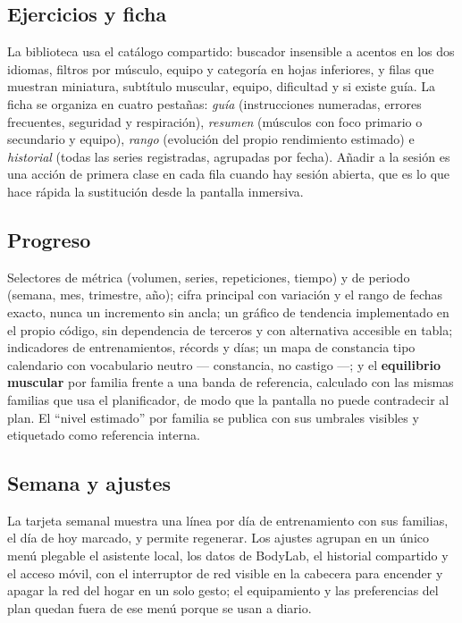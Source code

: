 \documentclass[conference]{IEEEtran}
\begin{document}
\subsection{Ejercicios y ficha}
La biblioteca usa el cat\'alogo compartido: buscador insensible a acentos en los
dos idiomas, filtros por m\'usculo, equipo y categor\'ia en hojas inferiores, y
filas que muestran miniatura, subt\'itulo muscular, equipo, dificultad y si
existe gu\'ia. La ficha se organiza en cuatro pesta\~nas: \emph{gu\'ia}
(instrucciones numeradas, errores frecuentes, seguridad y respiraci\'on),
\emph{resumen} (m\'usculos con foco primario o secundario y equipo),
\emph{rango} (evoluci\'on del propio rendimiento estimado) e \emph{historial}
(todas las series registradas, agrupadas por fecha). A\~nadir a la sesi\'on es
una acci\'on de primera clase en cada fila cuando hay sesi\'on abierta, que es lo
que hace r\'apida la sustituci\'on desde la pantalla inmersiva.

\subsection{Progreso}
Selectores de m\'etrica (volumen, series, repeticiones, tiempo) y de periodo
(semana, mes, trimestre, a\~no); cifra principal con variaci\'on y el rango de
fechas exacto, nunca un incremento sin ancla; un gr\'afico de tendencia
implementado en el propio c\'odigo, sin dependencia de terceros y con alternativa
accesible en tabla; indicadores de entrenamientos, r\'ecords y d\'ias; un mapa de
constancia tipo calendario con vocabulario neutro --- constancia, no castigo ---;
y el \textbf{equilibrio muscular} por familia frente a una banda de referencia,
calculado con las mismas familias que usa el planificador, de modo que la
pantalla no puede contradecir al plan. El ``nivel estimado'' por familia se
publica con sus umbrales visibles y etiquetado como referencia interna.

\subsection{Semana y ajustes}
La tarjeta semanal muestra una l\'inea por d\'ia de entrenamiento con sus
familias, el d\'ia de hoy marcado, y permite regenerar. Los ajustes agrupan en un
\'unico men\'u plegable el asistente local, los datos de BodyLab, el historial
compartido y el acceso m\'ovil, con el interruptor de red visible en la cabecera
para encender y apagar la red del hogar en un solo gesto; el equipamiento y las
preferencias del plan quedan fuera de ese men\'u porque se usan a diario.
\end{document}
